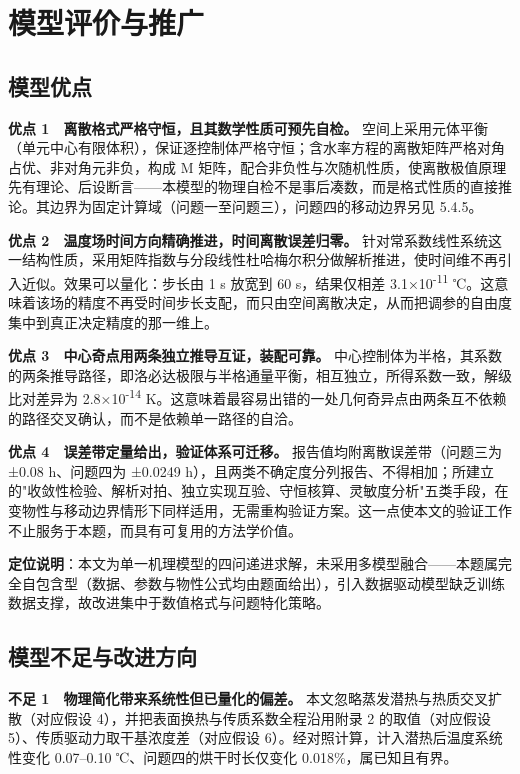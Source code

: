 \section{模型评价与推广}
\subsection{模型优点}
\textbf{优点 1　离散格式严格守恒，且其数学性质可预先自检。} 空间上采用元体平衡（单元中心有限体积），保证逐控制体严格守恒；含水率方程的离散矩阵严格对角占优、非对角元非负，构成 M 矩阵，配合非负性与次随机性质，使离散极值原理先有理论、后设断言——本模型的物理自检不是事后凑数，而是格式性质的直接推论。其边界为固定计算域（问题一至问题三），问题四的移动边界另见 5.4.5。

\textbf{优点 2　温度场时间方向精确推进，时间离散误差归零。} 针对常系数线性系统这一结构性质，采用矩阵指数与分段线性杜哈梅尔积分做解析推进，使时间维不再引入近似。效果可以量化：步长由 1 s 放宽到 60 s，结果仅相差 3.1×10\textsuperscript{-11} ℃。这意味着该场的精度不再受时间步长支配，而只由空间离散决定，从而把调参的自由度集中到真正决定精度的那一维上。

\textbf{优点 3　中心奇点用两条独立推导互证，装配可靠。} 中心控制体为半格，其系数的两条推导路径，即洛必达极限与半格通量平衡，相互独立，所得系数一致，解级比对差异为 2.8×10\textsuperscript{-14} K。这意味着最容易出错的一处几何奇异点由两条互不依赖的路径交叉确认，而不是依赖单一路径的自洽。

\textbf{优点 4　误差带定量给出，验证体系可迁移。} 报告值均附离散误差带（问题三为 ±0.08 h、问题四为 ±0.0249 h），且两类不确定度分列报告、不得相加；所建立的"收敛性检验、解析对拍、独立实现互验、守恒核算、灵敏度分析"五类手段，在变物性与移动边界情形下同样适用，无需重构验证方案。这一点使本文的验证工作不止服务于本题，而具有可复用的方法学价值。

\textbf{定位说明}：本文为单一机理模型的四问递进求解，未采用多模型融合——本题属完全自包含型（数据、参数与物性公式均由题面给出），引入数据驱动模型缺乏训练数据支撑，故改进集中于数值格式与问题特化策略。

\subsection{模型不足与改进方向}
\textbf{不足 1　物理简化带来系统性但已量化的偏差。} 本文忽略蒸发潜热与热质交叉扩散（对应假设 4），并把表面换热与传质系数全程沿用附录 2 的取值（对应假设 5）、传质驱动力取干基浓度差（对应假设 6）。经对照计算，计入潜热后温度系统性变化 0.07–0.10 ℃、问题四的烘干时长仅变化 0.018\%，属已知且有界。

